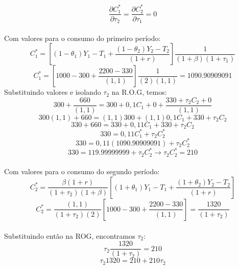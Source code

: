 \documentclass{article}
\begin{document}
\begin{equation}
    \frac{\partial C_1^*}{\partial \tau_2} = \frac{\partial C_2^*}{\partial \tau_1} = 0
\end{equation}
\\
Com valores para o consumo do primeiro período:
\begin{equation}
    C_1^*=\left[(1-\theta_1)Y_1-T_1+\frac{(1-\theta_2)Y_2-T_2}{(1+r)}\right]\frac{1}{(1+\beta)(1+\tau_1)}
\end{equation}
\begin{equation}
    C_1^*=\left[1000-300+\frac{2200-330}{(1,1)}\right]\frac{1}{(2)(1,1)} = 1090.90909091
\end{equation}
Substituindo valores e isolando $\tau_2$ na R.O.G, temos:
\begin{equation}
    300+\frac{660}{(1,1)}=300+0,1 C_1+0+\frac{330+\tau_2 C_2+0}{(1,1)}
\end{equation}
\begin{equation}
    300(1,1)+660=(1,1)300+(1,1)0,1 C_1+330+\tau_2 C_2
\end{equation}
\begin{equation}
    330+660=330+0,11 C_1+330+\tau_2 C_2
\end{equation}
\begin{equation}
    330=0,11 C_1^*+\tau_2 C_2^*
\end{equation}
\begin{equation}
    330=0,11 (1090.90909091)+\tau_2 C_2^*
\end{equation}
\begin{equation}
    330=119.99999999+\tau_2 C_2^* \to \tau_2 C_2^* = 210
\end{equation}
\\
Com valores para o consumo do segundo período:
\begin{equation}
    C_2^*=\frac{\beta(1+r)}{(1+\tau_2)(1+\beta)}\left[(1+\theta_1)Y_1-T_1+\frac{(1+\theta_2)Y_2-T_2}{(1+r)}\right]
\end{equation}
\begin{equation}
    C_2^*=\frac{(1,1)}{(1+\tau_2)(2)}\left[1000-300+\frac{2200-330}{(1,1)}\right]=\frac{1320}{(1+\tau_2)}
\end{equation}
\\
Substituindo então na ROG, encontramos $\tau_2$:
\begin{equation}
    \tau_2 \frac{1320}{(1+\tau_2)} = 210
\end{equation}
\begin{equation}
    \tau_2 1320 = 210 + 210\tau_2
\end{equation}
\end{document}
